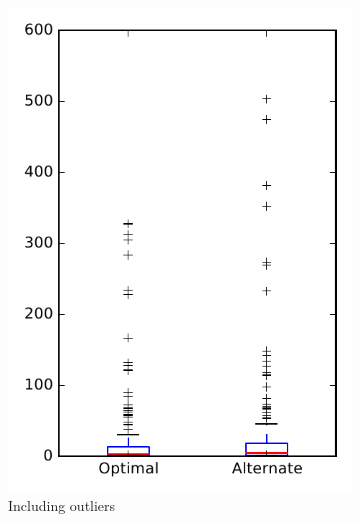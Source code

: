 
\begin{figure}
    \centering
    \begin{subfigure}{.4\textwidth}
        \centering
        \includegraphics[height=0.4\textheight]{figures/combo/flt_rq2_zookeeper}
        \caption{Including outliers}\label{fig:combo:flt:rq2:zookeeper_outlier}
    \end{subfigure}%
    \begin{subfigure}{.4\textwidth}
        \centering

\end{subfigure}
\end{figure}
